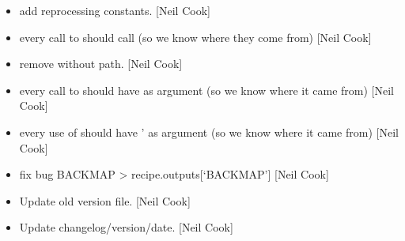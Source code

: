 \documentclass[a4paper,10pt,english]{report}
\begin{document}
\begin{itemize}
\item {} 
 \sphinxhyphen{} add reprocessing constants. {[}Neil Cook{]}

\item {} 
 \sphinxhyphen{} every call to  should call  (so
we know where they come from) {[}Neil Cook{]}

\item {} 
 \sphinxhyphen{} remove  without path. {[}Neil Cook{]}

\item {} 
 \sphinxhyphen{} every call to  should
have  as argument (so we know where it came from) {[}Neil Cook{]}

\item {} 
 \sphinxhyphen{} every use of 
should have ’ as argument (so we know where it came from)
{[}Neil Cook{]}

\item {} 
 \sphinxhyphen{} fix bug BACKMAP \textendash{}\textgreater{}
recipe.outputs{[}‘BACKMAP’{]} {[}Neil Cook{]}

\item {} 
Update old version file. {[}Neil Cook{]}

\item {} 
Update changelog/version/date. {[}Neil Cook{]}

\end{itemize}
\end{document}
